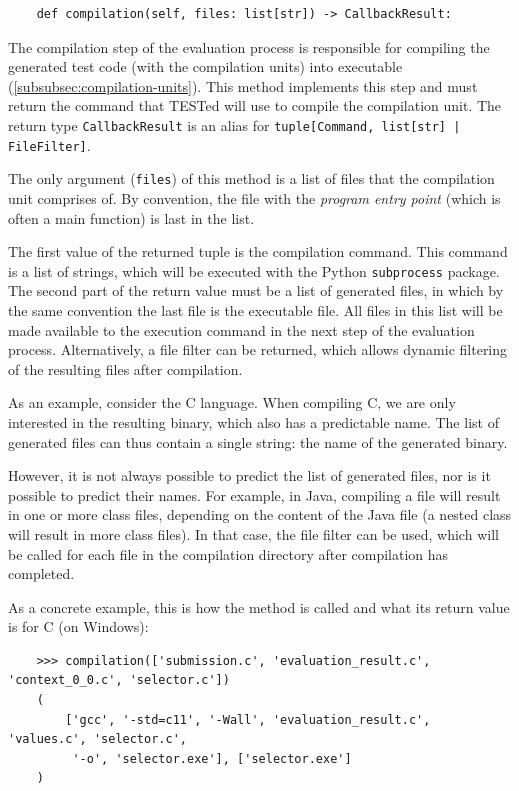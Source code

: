 \documentclass[../main]{subfiles}
\begin{document}
\begin{verbatim}
    def compilation(self, files: list[str]) -> CallbackResult:
\end{verbatim}

The compilation step of the evaluation process is responsible for compiling the generated test code (with the compilation units) into executable (\cref{subsubsec:compilation-units}).
This method implements this step and must return the command that TESTed will use to compile the compilation unit.
The return type \texttt{CallbackResult} is an alias for \texttt{tuple[Command, list[str] | FileFilter]}.

The only argument (\texttt{files}) of this method is a list of files that the compilation unit comprises of.
By convention, the file with the \emph{program entry point} (which is often a main function) is last in the list.

The first value of the returned tuple is the compilation command.
This command is a list of strings, which will be executed with the Python \texttt{subprocess} package.
The second part of the return value must be a list of generated files, in which by the same convention the last file is the executable file.
All files in this list will be made available to the execution command in the next step of the evaluation process.
Alternatively, a file filter can be returned, which allows dynamic filtering of the resulting files after compilation.

As an example, consider the C language.
When compiling C, we are only interested in the resulting binary, which also has a predictable name.
The list of generated files can thus contain a single string: the name of the generated binary.

However, it is not always possible to predict the list of generated files, nor is it possible to predict their names.
For example, in Java, compiling a file will result in one or more class files, depending on the content of the Java file (a nested class will result in more class files).
In that case, the file filter can be used, which will be called for each file in the compilation directory after compilation has completed.

As a concrete example, this is how the method is called and what its return value is for C (on Windows):

\begin{verbatim}
    >>> compilation(['submission.c', 'evaluation_result.c', 'context_0_0.c', 'selector.c'])
    (
        ['gcc', '-std=c11', '-Wall', 'evaluation_result.c', 'values.c', 'selector.c',
         '-o', 'selector.exe'], ['selector.exe']
    )
\end{verbatim}
\end{document}
